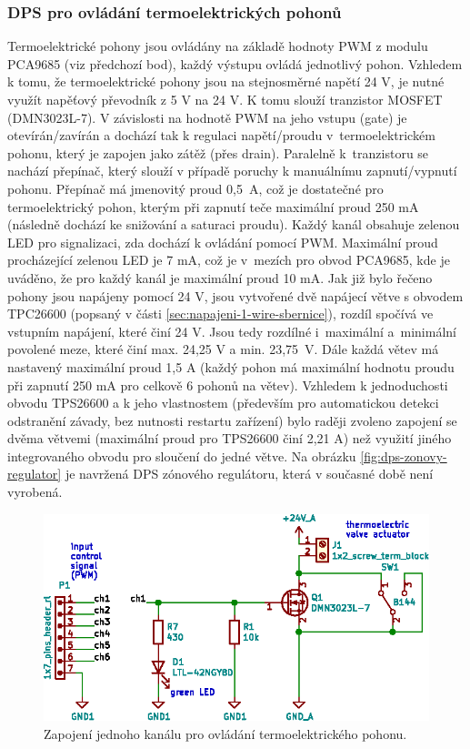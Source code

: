 \subsubsection{DPS pro ovládání termoelektrických pohonů}
Termoelektrické pohony jsou ovládány na základě hodnoty PWM z modulu PCA9685 (viz předchozí bod), každý výstupu ovládá jednotlivý pohon. Vzhledem k tomu, že termoelektrické pohony jsou na stejnosměrné napětí 24 V, je nutné využít napěťový převodník z 5 V na 24 V. K tomu slouží tranzistor MOSFET (DMN3023L-7). V závislosti na hodnotě PWM na jeho vstupu (gate) je otevírán/zavírán a dochází tak k regulaci napětí/proudu v~termoelektrickém pohonu, který je zapojen jako zátěž (přes drain). Paralelně k~tranzistoru se nachází přepínač, který slouží v případě poruchy k manuálnímu zapnutí/vypnutí pohonu. Přepínač má jmenovitý proud 0,5~A, což je dostatečné pro termoelektrický pohon, kterým při zapnutí teče maximální proud 250 mA (následně dochází ke snižování a saturaci proudu). Každý kanál obsahuje zelenou LED pro signalizaci, zda dochází k ovládání pomocí PWM. Maximální proud procházející zelenou LED je 7 mA, což je v~mezích pro obvod PCA9685, kde je uváděno, že pro každý kanál je maximální proud 10 mA. Jak již bylo řečeno pohony jsou napájeny pomocí 24 V, jsou vytvořené dvě napájecí větve s obvodem TPC26600 (popsaný v části \ref{sec:napajeni-1-wire-sbernice}), rozdíl spočívá ve vstupním napájení, které činí 24 V. Jsou tedy rozdílné i~maximální a~minimální povolené meze, které činí max. 24,25 V a min. 23,75~V. Dále každá větev má nastavený maximální proud 1,5 A (každý pohon má maximální hodnotu proudu při zapnutí 250 mA pro celkově 6 pohonů na větev). Vzhledem k jednoduchosti obvodu TPS26600 a k jeho vlastnostem (především pro automatickou detekci odstranění závady, bez nutnosti restartu zařízení) bylo raději zvoleno zapojení se dvěma větvemi (maximální proud pro TPS26600 činí 2,21 A) než využití jiného integrovaného obvodu pro sloučení do jedné větve. Na obrázku \ref{fig:dps-zonovy-regulator} je navržená DPS zónového regulátoru, která v současné době není vyrobená.


\begin{figure}[H]
    \centering
    \includegraphics[width=\textwidth]{images/svg/kicad/zonovy-regulator-mosfet-pwm.eps}
    \caption{Zapojení jednoho kanálu pro ovládání termoelektrického pohonu.}
    \label{fig:zonovy-regulator-mosfet-pwm}
\end{figure}


